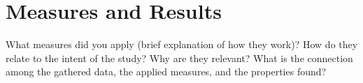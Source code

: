 \section{Measures and Results}
\label{measures}

What measures did you apply (brief explanation of how they work)? How do
they relate to the intent of the study? Why are they relevant? What is the connection among the gathered data, the applied measures,
and the properties found?
